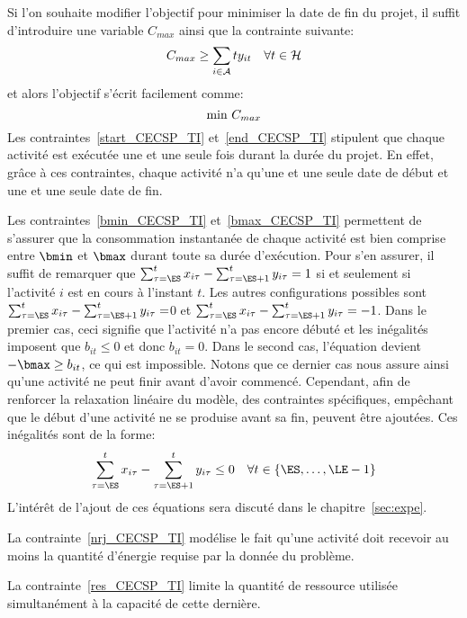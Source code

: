 Si l'on souhaite modifier l'objectif pour minimiser la date de fin
du projet, il suffit d'introduire une variable $C_{max}$ ainsi que
la contrainte suivante: 
\begin{equation} 
C_{max} \ge \sum_{i \in {\cal A}} ty_{it} \quad \forall t \in {\cal H} \notag
\end{equation} 
et alors l'objectif s'écrit facilement comme: 
\begin{equation}
\text{min } C_{max} \notag
\end{equation} 
Les contraintes~\eqref{start_CECSP_TI} et~\eqref{end_CECSP_TI}
stipulent que chaque activité est exécutée une et une seule fois
durant la durée du projet. En effet, grâce à ces contraintes, chaque
activité n'a qu'une et une seule date de début et une et une seule
date de fin.

Les contraintes~\eqref{bmin_CECSP_TI} et~\eqref{bmax_CECSP_TI}
permettent de s'assurer que la consommation instantanée de chaque
activité est bien comprise entre $\bmin$ et $\bmax$ durant toute sa
durée d'exécution. Pour s'en assurer, il suffit de remarquer que
$\sum_{\tau=\ES}^{t} x_{i\tau} -\sum_{\tau=\ES+1}^{t}y_{i\tau}=1$ si
et seulement si l'activité $i$ est en cours à l'instant $t$. Les
autres configurations possibles sont $\sum_{\tau=\ES}^{t} x_{i\tau}
-\sum_{\tau=\ES+1}^{t} y_{i\tau}=$0 et $\sum_{\tau=\ES}^{t} x_{i\tau}
-\sum_{\tau=\ES+1}^{t} y_{i\tau}=-1$. Dans le premier cas, ceci
signifie que l'activité n'a pas encore débuté et les inégalités
imposent que $b_{it} \le 0$ et donc $b_{it}=0$. Dans le second cas,
l'équation devient $-\bmax \ge b_{it}$, ce qui est impossible. Notons
que ce dernier cas nous assure ainsi qu'une activité ne peut finir avant
d'avoir commencé. Cependant, afin de renforcer la relaxation linéaire
du modèle, des contraintes spécifiques, empêchant que le début d'une
activité ne se produise avant sa fin, peuvent être ajoutées. Ces
inégalités sont de la forme: 
\begin{equation}
 \sum_{\tau=\ES}^{t} x_{i\tau}
-\sum_{\tau=\ES+1}^{t} y_{i\tau} \le 0 \quad \forall t \in \{\ES,\dots,\LE-1\}
\end{equation}
L'intérêt de l'ajout de ces équations sera discuté dans le
chapitre~\ref{sec:expe}.  

La contrainte~\eqref{nrj_CECSP_TI} modélise le fait qu'une activité
doit recevoir au moins la quantité d'énergie requise par la donnée du
problème.

La contrainte~\eqref{res_CECSP_TI} limite la quantité de ressource
utilisée simultanément à la capacité de cette dernière.

